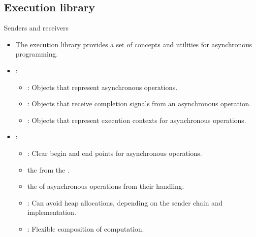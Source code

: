 \subsection{Execution library}

\begin{frame}[t,fragile]{Senders and receivers}
  \begin{itemize}
    \item The execution library provides a set of concepts and utilities for asynchronous programming.

    \item {}:
      \begin{itemize}
        \item {}: Objects that represent asynchronous operations.
        \item {}: Objects that receive completion signals from an asynchronous operation.
        \item {}: Objects that represent execution contexts for asynchronous operations.
      \end{itemize}

    \item {}:
      \begin{itemize}
        \item {}: Clear begin and end points for asynchronous operations.
        \item {} the  from the .
        \item {} the  of asynchronous operations from their  handling.
        \item {}: Can avoid heap allocations, depending on the sender chain and implementation.
        \item {}: Flexible composition of computation.
      \end{itemize}
  \end{itemize}
\end{frame}


